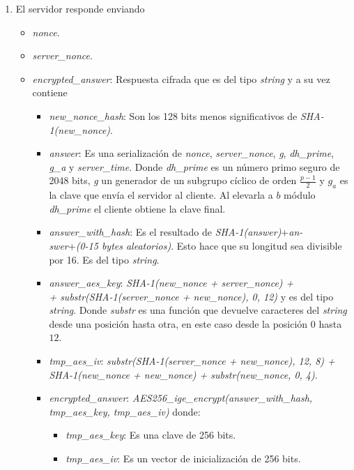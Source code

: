 \begin{enumerate}
	\item El servidor responde enviando
		\begin{itemize}
			\item \emph{nonce}.
			\item \emph{server\_nonce}.
			\item \emph{encrypted\_answer}: Respuesta cifrada que es del tipo \emph{string} y a su vez contiene
			\begin{itemize}
				\item \emph{new\_nonce\_hash}: Son los 128 bits menos significativos de \emph{SHA-1(new\_nonce)}.
				\item \emph{answer}: Es una serialización de \emph{nonce}, \emph{server\_nonce}, \emph{g}, \emph{dh\_prime}, \emph{g\_a} y \emph{server\_time}. Donde \emph{dh\_prime} es un número primo seguro de 2048 bits, \emph{g} un generador de un subgrupo cíclico de orden $\frac{p-1}{2}$ y $g_a$ es la clave que envía el servidor al cliente. Al elevarla a $b$ módulo \emph{dh\_prime} el cliente obtiene la clave final.
\item \emph{answer\_with\_hash}: Es el resultado de \emph{SHA-1(answer)}+\emph{an-\\swer}+\emph{(0-15 bytes aleatorios)}. Esto hace que su longitud sea divisible por 16. Es del tipo \emph{string}.
				\item \emph{answer\_aes\_key}: \emph{SHA-1(new\_nonce + server\_nonce) +\\+ substr(SHA-1(server\_nonce + new\_nonce), 0, 12)} y es del tipo \emph{string}. Donde \emph{substr} es una función que devuelve caracteres del \emph{string} desde una posición hasta otra, en este caso desde la posición $0$ hasta $12$.
				\item \emph{tmp\_aes\_iv}: \emph{substr(SHA-1(server\_nonce + new\_nonce), 12, 8) + SHA-1(new\_nonce + new\_nonce) + substr(new\_nonce, 0, 4)}.
				\item \emph{encrypted\_answer}: \emph{AES256\_ige\_encrypt(answer\_with\_hash,\\ tmp\_aes\_key, tmp\_aes\_iv)} donde:
				\begin{itemize}
					\item \emph{tmp\_aes\_key}: Es una clave de 256 bits.
					\item \emph{tmp\_aes\_iv}: Es un vector de inicialización de 256 bits.
				\end{itemize}

			\end{itemize}
		\end{itemize}


\end{enumerate}
